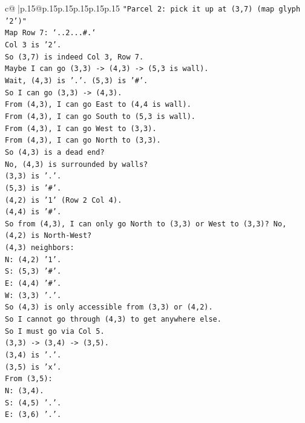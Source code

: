 \documentclass{article}
\begin{document}
{\begin{supertabular}{c@{$\;$}|p{.15\linewidth}@{}p{.15\linewidth}p{.15\linewidth}p{.15\linewidth}p{.15\linewidth}p{.15\linewidth}}
{{{\texttt{"Parcel 2: pick it up at (3,7) (map glyph '2')"} \\
\texttt{Map Row 7: `..2...\#.`} \\
\texttt{Col 3 is '2'.} \\
\texttt{So (3,7) is indeed Col 3, Row 7.} \\
\texttt{Maybe I can go (3,3) {-}> (4,3) {-}> (5,3 is wall).} \\
\texttt{Wait, (4,3) is '.'. (5,3) is '\#'.} \\
\texttt{So I can go (3,3) {-}> (4,3).} \\
\texttt{From (4,3), I can go East to (4,4 is wall).} \\
\texttt{From (4,3), I can go South to (5,3 is wall).} \\
\texttt{From (4,3), I can go West to (3,3).} \\
\texttt{From (4,3), I can go North to (3,3).} \\
\texttt{So (4,3) is a dead end?} \\
\texttt{No, (4,3) is surrounded by walls?} \\
\texttt{(3,3) is '.'.} \\
\texttt{(5,3) is '\#'.} \\
\texttt{(4,2) is '1' (Row 2 Col 4).} \\
\texttt{(4,4) is '\#'.} \\
\texttt{So from (4,3), I can only go North to (3,3) or West to (3,3)? No, (4,2) is North{-}West?} \\
\texttt{(4,3) neighbors:} \\
\texttt{N: (4,2) '1'.} \\
\texttt{S: (5,3) '\#'.} \\
\texttt{E: (4,4) '\#'.} \\
\texttt{W: (3,3) '.'.} \\
\texttt{So (4,3) is only accessible from (3,3) or (4,2).} \\
\texttt{So I cannot go through (4,3) to get anywhere else.} \\
\texttt{So I must go via Col 5.} \\
\texttt{(3,3) {-}> (3,4) {-}> (3,5).} \\
\texttt{(3,4) is '.'.} \\
\texttt{(3,5) is 'x'.} \\
\texttt{From (3,5):} \\
\texttt{N: (3,4).} \\
\texttt{S: (4,5) '.'.} \\
\texttt{E: (3,6) '.'.} \\
}}}
\end{supertabular}}
\end{document}
